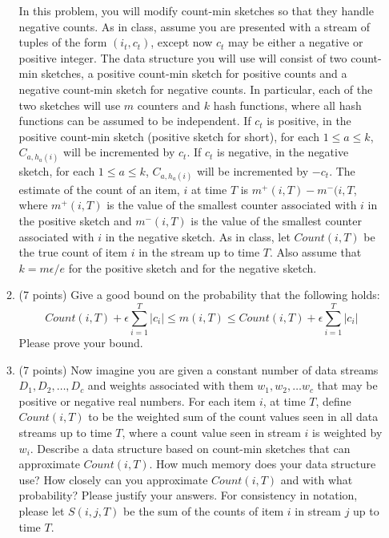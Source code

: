 \documentclass[11pt]{article}
\begin{document}
\begin{enumerate}
\begin{enumerate}
In this problem, you will modify count-min sketches so that they handle negative counts.  As in class, assume you are presented with a stream of tuples of the form $(i_{t},c_{t})$, except now $c_{t}$ may be either a negative or positive integer.  The data structure you will use will consist of two count-min sketches, a positive count-min sketch for positive counts and a negative count-min sketch for negative counts.  In particular, each of the two sketches will use $m$ counters and $k$ hash functions, where all hash functions can be assumed to be independent.  If $c_{t}$ is positive, in the positive count-min sketch (positive sketch for short),  for each $1 \leq a \leq k$, $C_{a,h_{a}(i)}$ will be incremented by $c_{t}$.  If $c_{t}$ is negative, in the negative sketch, for each $1 \leq a \leq k$, $C_{a,h_{a}(i)}$ will be incremented by $-c_{t}$.   The estimate of the count of an item, $i$ at time $T$ is $m^{+}(i,T) - m^{-}(i,T$, where $m^{+}(i,T)$ is the value of the smallest counter associated with $i$ in the positive sketch and $m^{-}(i,T)$ is the value of the smallest counter associated with $i$ in the negative sketch.  As in class, let $Count(i,T)$ be the true count of item $i$ in the stream up to time $T$.  Also assume that $k = m \epsilon/e$ for the positive sketch and for the negative sketch.
 
 \item (7 points) Give a good bound on the probability that the following holds:\\
 $$ Count(i,T) + \epsilon \sum_{i=1}^{T} |c_{i}| \leq m(i,T) \leq Count(i,T) + \epsilon \sum_{i=1}^{T} |c_{i}| $$
 Please prove your bound.
 
 
\pagebreak

\item  (7 points) Now imagine you are given a constant number of data streams $D_{1}, D_{2}, \ldots, D_{c}$ and weights associated with them $w_{1}, w_{2}, \ldots w_{c}$ that may be positive or negative real numbers.  For each item $i$, at time $T$, define $Count(i,T)$ to be the weighted sum of the count values seen in all data streams up to time $T$, where a count value seen in stream $i$ is weighted by $w_{i}$.  Describe a data structure based on count-min sketches that can approximate $Count(i,T)$.  How much memory does your data structure use? How closely can you approximate $Count(i,T)$ and with what probability?  Please justify your answers.  For consistency in notation, please let $S(i,j,T)$ be the sum of the counts of item $i$ in stream $j$ up to time $T$.


\end{enumerate}
\end{enumerate}
\end{document}
